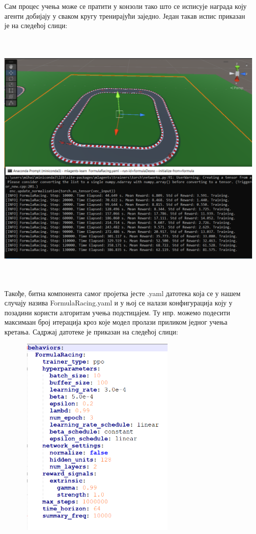 \documentclass[12pt]{article}
\begin{document}
\vspace{0.5cm}
Сам процес учења може се пратити у конзоли тако што се исписује награда коју агенти добијају у сваком кругу тренирајући заједно. Један такав испис приказан је на следећој слици:
\begin{center}
    \centering 
    \includegraphics[height=13cm, width=16cm]{images/rewardOutput.png}
\end{center}
\vspace{0.5cm}
Такође, битна компонента самог пројетка јесте .yaml датотека која се у нашем случају назива FormulaRacing.yaml и у њој се налази конфигурација коју у позадини користи алгоритам учења подстицајем. Ту нпр. можемо подесити максимаан број итерација кроз које модел пролази приликом једног учења кретања. Садржај датотеке је приказан на следећој слици:
\begin{center}
    \centering 
    \includegraphics[height=10cm, width=10cm]{images/yamlFile.png}
\end{center}
\end{document}
